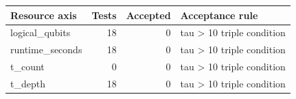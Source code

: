 \begin{tabular}{lrrl}
\toprule
Resource axis & Tests & Accepted & Acceptance rule \\
\midrule
logical\_qubits & 18 & 0 & tau > 10 triple condition \\
runtime\_seconds & 18 & 0 & tau > 10 triple condition \\
t\_count & 0 & 0 & tau > 10 triple condition \\
t\_depth & 18 & 0 & tau > 10 triple condition \\
\bottomrule
\end{tabular}
